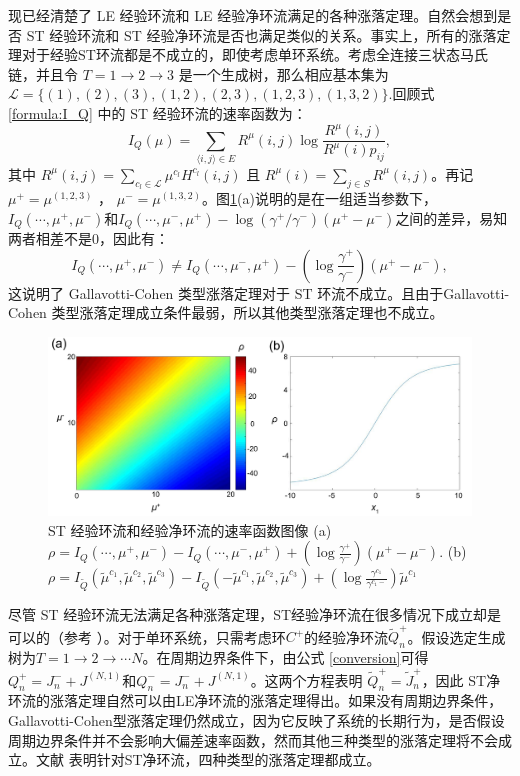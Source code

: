 现已经清楚了 LE 经验环流和 LE 经验净环流满足的各种涨落定理。自然会想到是否 ST 经验环流和 ST 经验净环流是否也满足类似的关系。事实上，所有的涨落定理对于经验ST环流都是不成立的，即使考虑单环系统。考虑全连接三状态马氏链，并且令 $T = 1\to 2\to 3$ 是一个生成树，那么相应基本集为$\mathcal{L} = \{(1),(2),(3),(1,2),(2,3),(1,2,3),(1,3,2)\}.$回顾式 \eqref{formula:I_Q} 中的 ST 经验环流的速率函数为：
\begin{equation*}
I_Q(\mu) = \sum_{\langle i,j\rangle\in E}R^{\mu}(i,j)\log\frac{R^{\mu}(i,j)}{R^{\mu}(i)p_{ij}},
\end{equation*}
其中 $R^{\mu}(i,j)=\sum_{c_l\in\mathcal{L}}\mu^{c_l}H^{c_l}(i,j)$ 且 $R^{\mu}(i)=\sum_{j\in S}R^{\mu}(i,j)$。再记 $\mu^+ = \mu^{(1,2,3)}$ ， $\mu^- = \mu^{(1,3,2)}$。图\ref{figure:ratefunction}(a)说明的是在一组适当参数下，$I_Q(\cdots,\mu^+,\mu^-)$和$I_Q(\cdots,\mu^-,\mu^+)-\log(\gamma^+ /\gamma^-) (\mu^+-\mu^-)$之间的差异，易知两者相差不是0，因此有：
\begin{equation*}
I_Q(\cdots,\mu^+,\mu^-)
\neq I_Q(\cdots,\mu^-,\mu^+)-\left(\log\frac{\gamma^+}{\gamma^-}\right)(\mu^+-\mu^-),
\end{equation*}
这说明了 Gallavotti-Cohen 类型涨落定理对于 ST 环流不成立。且由于Gallavotti-Cohen 类型涨落定理成立条件最弱，所以其他类型涨落定理也不成立。
\begin{figure}[h]
	\centering
	\includegraphics[scale=0.25]{chart/ratefunction.pdf}
	\caption{ST 经验环流和经验净环流的速率函数图像 (a) $\rho=I_Q(\cdots,\mu^+,\mu^-)-I_Q(\cdots,\mu^-,\mu^+)+(\log\frac{\gamma^+}{\gamma^-})(\mu^+-\mu^-)$. (b) $\rho=I_{\tilde{Q}}(\tilde{\mu}^{c_1},\tilde{\mu}^{c_2},\tilde{\mu}^{c_3})- I_{\tilde{Q}}(-\tilde{\mu}^{c_1},\tilde{\mu}^{c_2},\tilde{\mu}^{c_3})
		+(\log\frac{\gamma^{c_1}}{\gamma^{c_1-}})\tilde{\mu}^{c_1}$}\label{figure:ratefunction}
\end{figure}
尽管 ST 经验环流无法满足各种涨落定理，ST经验净环流在很多情况下成立却是可以的（参考 \cite{andrieux2007fluctuation}）。对于单环系统，只需考虑环$C^+$的经验净环流$\tilde{Q}^+_n$。假设选定生成树为$T = 1 \rightarrow 2 \rightarrow \cdots N$。在周期边界条件下，由公式 \ref{conversion}可得$Q_n^+=J_n^- + J^{(N,1)}$和$Q_n^-=J_n^- + J^{(N,1)}$。这两个方程表明 $\tilde{Q}_n^+ = \tilde{J}_n^+$，因此 ST净环流的涨落定理自然可以由LE净环流的涨落定理得出。如果没有周期边界条件，Gallavotti-Cohen型涨落定理仍然成立，因为它反映了系统的长期行为，是否假设周期边界条件并不会影响大偏差速率函数，然而其他三种类型的涨落定理将不会成立。文献\cite{polettini2014transient} 表明针对ST净环流，四种类型的涨落定理都成立。

